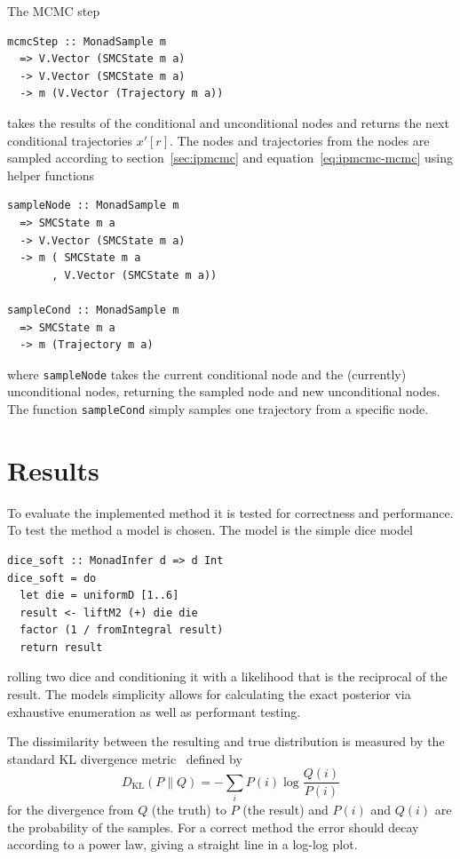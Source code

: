 The MCMC step
\begin{verbatim}
mcmcStep :: MonadSample m
  => V.Vector (SMCState m a) 
  -> V.Vector (SMCState m a)
  -> m (V.Vector (Trajectory m a))
\end{verbatim}
takes the results of the conditional and unconditional nodes and returns the next conditional trajectories $x'[r]$. The nodes and trajectories from the nodes are sampled according to section~\ref{sec:ipmcmc} and equation~\ref{eq:ipmcmc-mcmc} using helper functions
\begin{verbatim}
sampleNode :: MonadSample m
  => SMCState m a
  -> V.Vector (SMCState m a)
  -> m ( SMCState m a
       , V.Vector (SMCState m a))

sampleCond :: MonadSample m
  => SMCState m a
  -> m (Trajectory m a)
\end{verbatim}
where \texttt{sampleNode} takes the current conditional node and the (currently) unconditional nodes, returning the sampled node and new unconditional nodes. The function \texttt{sampleCond} simply samples one trajectory from a specific node.

\section{Results}

To evaluate the implemented method it is tested for correctness and performance. To test the method a model is chosen. The model is the simple dice model
\begin{verbatim}
dice_soft :: MonadInfer d => d Int
dice_soft = do
  let die = uniformD [1..6]
  result <- liftM2 (+) die die
  factor (1 / fromIntegral result)
  return result
\end{verbatim}
rolling two dice and conditioning it with a likelihood that is the reciprocal of the result. The models simplicity allows for calculating the exact posterior via exhaustive enumeration as well as performant testing.

The dissimilarity between the resulting and true distribution is measured by the standard KL divergence metric~\cite{kl} defined by
\begin{equation}\label{eq:kl}
    D_{\mathrm{KL}} (P \parallel Q) = - \sum\limits_i P(i) \log \frac {Q(i)}{P(i)}
\end{equation}
for the divergence from $Q$ (the truth) to $P$ (the result) and $P(i)$ and $Q(i)$ are the probability of the samples. For a correct method the error should decay according to a power law, giving a straight line in a log-log plot.

